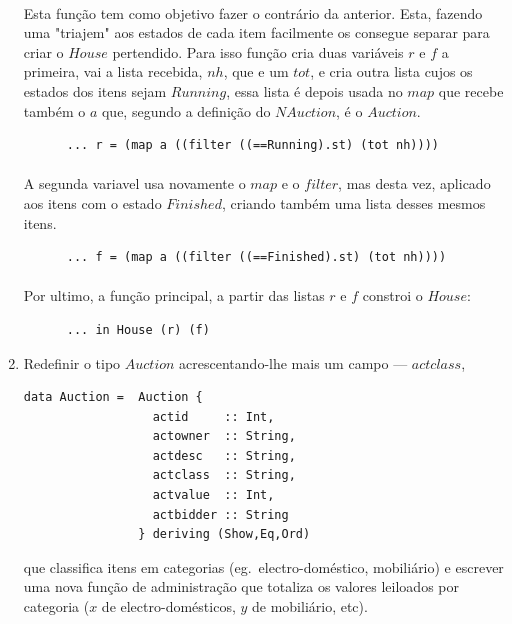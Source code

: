 \documentclass[a4paper]{article}
\begin{document}
\begin{enumerate}
\paragraph{}Esta função tem como objetivo fazer o contrário da anterior. Esta, fazendo uma "triajem" aos estados de cada item facilmente os consegue separar para criar o $House$ pertendido. Para isso função cria duas variáveis $r$ e $f$ a primeira, vai a lista recebida, $nh$, que e um $tot$, e cria outra lista cujos os estados dos itens sejam $Running$, essa lista é depois usada no $map$ que recebe também o $a$ que, segundo a definição do $NAuction$, é o $Auction$.
\begin{verbatim}
      ... r = (map a ((filter ((==Running).st) (tot nh))))
\end{verbatim}
\paragraph{}A segunda variavel usa novamente o $map$ e o $filter$, mas desta vez, aplicado aos itens com o estado $Finished$, criando também uma lista desses mesmos itens. 
\begin{verbatim}
      ... f = (map a ((filter ((==Finished).st) (tot nh))))
\end{verbatim}
\paragraph{}Por ultimo, a função principal, a partir das listas $r$ e $f$ constroi o $House$:
\begin{verbatim}
      ... in House (r) (f)
\end{verbatim}

\newpage

\item
Redefinir o tipo $Auction$ acrescentando-lhe mais um campo --- $actclass$, 
\begin{verbatim}
data Auction =  Auction {
                  actid     :: Int,
                  actowner  :: String,
                  actdesc   :: String,
                  actclass  :: String,
                  actvalue  :: Int,
                  actbidder :: String
                } deriving (Show,Eq,Ord) 
\end{verbatim}
que classifica itens em categorias (eg.\ electro-doméstico, mobiliário) e
escrever uma nova função de administração que totaliza os valores leiloados
por categoria ($x$ de electro-domésticos, $y$ de mobiliário, etc).


\end{enumerate}
\end{document}
